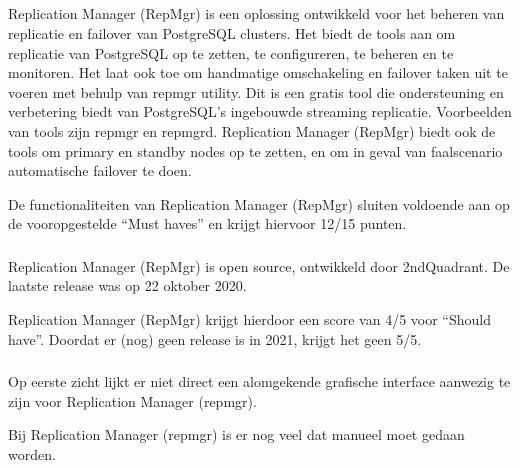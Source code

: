 \subsection{}
\label{subsec:Oplossing 4: Replication Manager (RepMgr)}

\subsubsection{}
\label{subsubsec:Must have}
Replication Manager (RepMgr) is een oplossing ontwikkeld voor het beheren van replicatie en failover van PostgreSQL clusters. Het biedt de tools aan om replicatie van PostgreSQL op te zetten, te configureren, te beheren en te monitoren. Het laat ook toe om handmatige omschakeling en failover taken uit te voeren met behulp van repmgr utility. Dit is een gratis tool die ondersteuning en verbetering biedt van PostgreSQL's ingebouwde streaming replicatie.
Voorbeelden van tools zijn repmgr en repmgrd.
Replication Manager (RepMgr) biedt ook de tools om primary en standby nodes op te zetten, en om in geval van faalscenario automatische failover te doen.

De functionaliteiten van Replication Manager (RepMgr) sluiten voldoende aan op de vooropgestelde “Must haves” en krijgt hiervoor 12/15 punten.

\subsubsection{}
\label{subsubsec:Should have}

Replication Manager (RepMgr) is open source, ontwikkeld door 2ndQuadrant.
De laatste release was op 22 oktober 2020.

Replication Manager (RepMgr) krijgt hierdoor een score van 4/5 voor “Should have”. Doordat er (nog) geen release is in 2021, krijgt het geen 5/5.

\subsubsection{}
\label{subsubsec:Could have}
Op eerste zicht lijkt er niet direct een alomgekende grafische interface aanwezig te zijn voor Replication Manager (repmgr).

Bij Replication Manager (repmgr) is er nog veel dat manueel moet gedaan worden.

